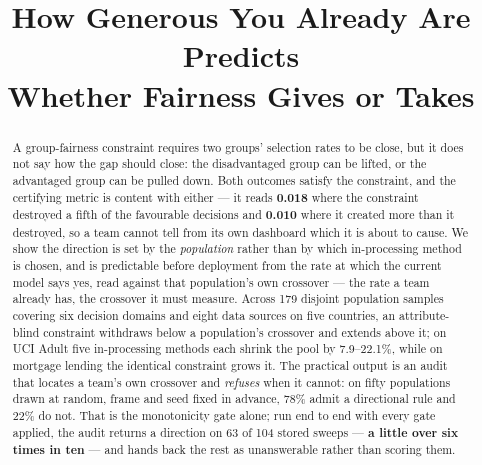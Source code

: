 \documentclass[conference]{IEEEtran}
\begin{document}
\title{How Generous You Already Are Predicts\\
Whether Fairness Gives or Takes}

\author{
}

\maketitle

\begin{abstract}
A group-fairness constraint requires two groups' selection rates to be close, but it does not
say how the gap should close: the disadvantaged group can be lifted, or the advantaged group
can be pulled down. Both outcomes satisfy the constraint, and the certifying metric is
content with either --- it reads \textbf{0.018} where the constraint destroyed a fifth of
the favourable decisions and \textbf{0.010} where it created more than it destroyed, so a
team cannot tell from its own dashboard which it is about to cause. We show the direction is set by the \emph{population} rather than by which in-processing
method is chosen, and is predictable before deployment from the rate at which the current
model says yes, read against that population's own crossover --- the rate a team already has,
the crossover it must measure. Across 179 disjoint population samples covering six decision domains
and eight data sources on five countries, an attribute-blind constraint withdraws below a
population's crossover and extends above it; on UCI Adult five in-processing methods each shrink the pool by
7.9--22.1\%, while on mortgage lending the identical constraint grows it. The practical output is an
audit that locates a team's own crossover and \emph{refuses} when it cannot: on fifty populations drawn at random, frame and seed fixed in advance, 78\% admit a
directional rule and 22\% do not. That is the monotonicity gate alone; run end to end with every
gate applied, the audit returns a direction on 63 of 104 stored sweeps --- \textbf{a little over six times in ten} --- and hands back the rest as unanswerable rather than scoring them.


\end{abstract}
\end{document}
